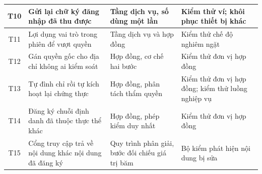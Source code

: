 \begin{longtable}{|c|p{3.9cm}|p{3.4cm}|p{4.5cm}|}
T10 & Gửi lại chữ ký đăng nhập đã thu được
& Tầng dịch vụ, số dùng một lần
& Kiểm thử ví; khôi phục thiết bị khác
\\ \hline

T11 & Lợi dụng vai trò trong phiên để vượt quyền
& Tầng dịch vụ và hợp đồng
& Kiểm thử chế độ nghiêm ngặt
\\ \hline

T12 & Gán quyền gốc cho địa chỉ không ai kiểm soát
& Hợp đồng, cơ chế hai bước
& Kiểm thử đơn vị hợp đồng
\\ \hline

T13 & Tự đình chỉ rồi tự kích hoạt lại chứng thực
& Hợp đồng, phân tách thẩm quyền
& Kiểm thử đơn vị hợp đồng; kiểm thử luồng nghiệp vụ
\\ \hline

T14 & Đăng ký chuỗi định danh đã thuộc thực thể khác
& Hợp đồng, phép kiểm duy nhất
& Kiểm thử đơn vị hợp đồng
\\ \hline

T15 & Cổng truy cập trả về nội dung khác nội dung đã đăng ký
& Quy trình phân giải, bước đối chiếu giá trị băm
& Bộ kiểm phát hiện nội dung bị sửa
\\ \hline

\end{longtable}
